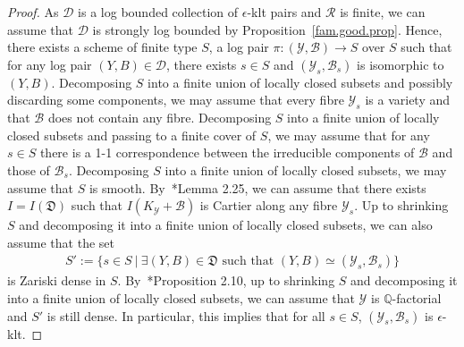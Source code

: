\documentclass[11pt]{ip-journal}
\theoremstyle{definition}
\begin{document}
\begin{proof}
As 
$\mathcal D$ 
is a log bounded collection of 
$\epsilon$-klt 
pairs and 
$\mathcal R$ 
is finite, we can assume that 
$\mathcal D$ 
is strongly log bounded by Proposition~\ref{fam.good.prop}.
Hence, there exists a scheme of finite type 
$S$, 
a log pair 
$\pi \colon (\mathcal Y, \mathcal B) \to S$ 
over 
$S$ 
such that for any log pair 
$(Y, B) \in \mathcal{D}$, 
there exists 
$s \in S$ 
and 
$(\mathcal{Y}_s, \mathcal{B}_s)$ 
is isomorphic to $(Y, B)$.
\newline
Decomposing $S$ into a finite union of locally closed subsets and possibly discarding some components, we may assume that every fibre $\mathcal{Y}_s$ is a variety and that $\mathcal{B}$ does not contain any fibre. 
Decomposing $S$ into a finite union of locally closed subsets and passing to a finite cover of $S$, we may assume that for any $s\in S$ there is a 1-1 correspondence between the irreducible components of $\mathcal B$ and those of $\mathcal B_s$.
Decomposing $S$ into a finite union of locally closed subsets, we may assume that $S$ is smooth.
By~\cite{Bir16a}*{Lemma 2.25}, we can assume that there exists $I=I(\mathfrak D)$ such that $I(K_\mathcal{Y}+\mathcal B)$ is Cartier along any fibre $\mathcal{Y}_s$. 
Up to shrinking $S$ and decomposing it into a finite union of locally closed subsets, we can also assume that the set 
\begin{align*}
   S':= \{s\in S \ \vert \ \exists ( Y, B) \in \mathfrak{D} \textrm{ such that } (Y, B) \simeq (\mathcal{Y}_s, \mathcal{B}_s)\}
\end{align*}
is Zariski dense in $S$.
By~\cite{1810.01990}*{Proposition 2.10}, up to shrinking $S$ and decomposing it into a finite union of locally closed subsets, we can assume that $\mathcal{Y}$ is $\mathbb{Q}$-factorial and $S'$ is still dense.
In particular, this implies that for all $s \in S$, $(\mathcal Y_s, \mathcal B_s)$ is $\epsilon$-klt.

\medskip


\end{proof}
\end{document}
